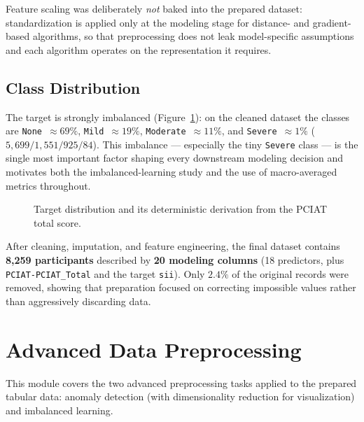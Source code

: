 Feature scaling was deliberately \emph{not} baked into the prepared dataset: standardization is applied only at the modeling stage for distance- and gradient-based algorithms, so that preprocessing does not leak model-specific assumptions and each algorithm operates on the representation it requires.

\subsection{Class Distribution}
The target is strongly imbalanced (Figure~\ref{fig:cmi_target}): on the cleaned dataset the classes are \texttt{None}~$\approx 69\%$, \texttt{Mild}~$\approx 19\%$, \texttt{Moderate}~$\approx 11\%$, and \texttt{Severe}~$\approx 1\%$ ($5{,}699 / 1{,}551 / 925 / 84$). This imbalance --- especially the tiny \texttt{Severe} class --- is the single most important factor shaping every downstream modeling decision and motivates both the imbalanced-learning study and the use of macro-averaged metrics throughout.\\

\begin{figure}[h]
    \centering
    \caption{Target distribution and its deterministic derivation from the PCIAT total score.}
    \label{fig:cmi_target}
\end{figure}

After cleaning, imputation, and feature engineering, the final dataset contains \textbf{8,259 participants} described by \textbf{20 modeling columns} (18 predictors, plus \texttt{PCIAT-PCIAT\_Total} and the target \texttt{sii}). Only $2.4\%$ of the original records were removed, showing that preparation focused on correcting impossible values rather than aggressively discarding data.

\section{Advanced Data Preprocessing}
This module covers the two advanced preprocessing tasks applied to the prepared tabular data: anomaly detection (with dimensionality reduction for visualization) and imbalanced learning.

